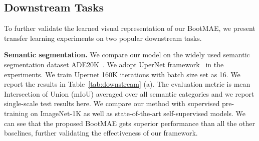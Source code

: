 \documentclass[runningheads]{llncs}
\begin{document}
\vspace{-1mm}
\subsection{Downstream Tasks}
\vspace{-1mm}
To further validate the learned visual representation of our BootMAE, we present transfer learning experiments on two popular downstream tasks.



\noindent \textbf{Semantic segmentation.}
We compare our model on the widely used semantic segmentation dataset ADE20K~\cite{zhou2017scene}. We adopt UperNet framework~\cite{xiao2018unified} in the experiments. We train Upernet 160K iterations with batch size set as 16. We report the results in Table~\ref{tab:downstream} (a). The evaluation metric is mean Intersection of Union (mIoU) averaged over all semantic categories and we report single-scale test results here.
We compare our method with supervised pre-training on ImageNet-1K as well as state-of-the-art self-supervised models.
We can see that the proposed BootMAE gets superior performance than all the other baselines, further validating the effectiveness of our framework.
\end{document}
